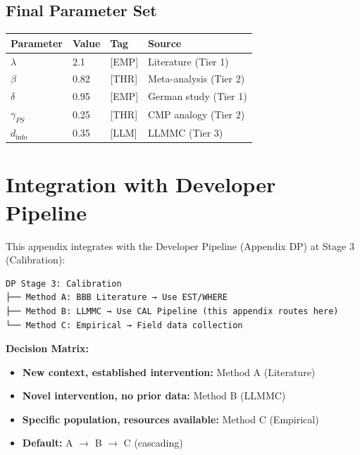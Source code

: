 \subsection{Final Parameter Set}

\begin{center}
\begin{tabular}{llll}
\toprule
\textbf{Parameter} & \textbf{Value} & \textbf{Tag} & \textbf{Source} \\
\midrule
$\lambda$ & 2.1 & [EMP] & Literature (Tier 1) \\
$\beta$ & 0.82 & [THR] & Meta-analysis (Tier 2) \\
$\delta$ & 0.95 & [EMP] & German study (Tier 1) \\
$\gamma_{PS}$ & 0.25 & [THR] & CMP analogy (Tier 2) \\
$d_{\text{info}}$ & 0.35 & [LLM] & LLMMC (Tier 3) \\
\bottomrule
\end{tabular}
\end{center}


\section{Integration with Developer Pipeline}
\label{sec:pm-integration}

This appendix integrates with the Developer Pipeline (Appendix DP) at Stage 3 (Calibration):

\begin{verbatim}
DP Stage 3: Calibration
├── Method A: BBB Literature → Use EST/WHERE
├── Method B: LLMMC → Use CAL Pipeline (this appendix routes here)
└── Method C: Empirical → Field data collection
\end{verbatim}

\textbf{Decision Matrix:}
\begin{itemize}[nosep]
    \item \textbf{New context, established intervention:} Method A (Literature)
    \item \textbf{Novel intervention, no prior data:} Method B (LLMMC)
    \item \textbf{Specific population, resources available:} Method C (Empirical)
    \item \textbf{Default:} A $\rightarrow$ B $\rightarrow$ C (cascading)
\end{itemize}

